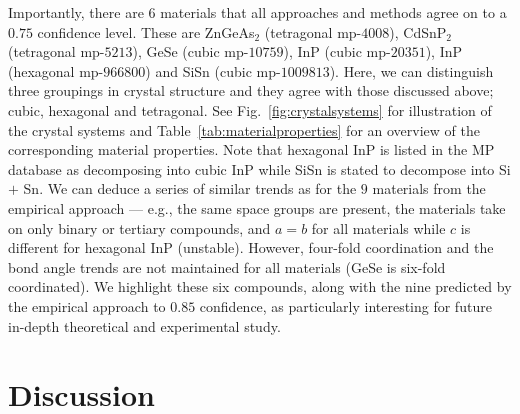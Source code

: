 \documentclass[superscriptaddress,unsortedaddress,
 amsmath,amssymb,
 aps,
]{revtex4-2}
\begin{document}
Importantly, there are $6$ materials that all approaches and methods agree on to a $0.75$ confidence level. These are ZnGeAs$_2$ (tetragonal mp-$4008$), CdSnP$_2$ (tetragonal mp-$5213$), GeSe (cubic mp-$10759$), InP (cubic mp-$20351$), InP (hexagonal mp-$966800$) and SiSn (cubic mp-$1009813$). Here, we can distinguish three groupings in crystal structure and they agree with those discussed above; cubic, hexagonal and tetragonal. See Fig.~\ref{fig:crystalsystems} for illustration of the crystal systems and Table~\ref{tab:materialproperties} for an overview of the corresponding material properties.     
Note that hexagonal InP is listed in the MP database as decomposing into cubic InP while SiSn is stated to decompose into Si $+$ Sn. 
We can deduce a series of similar trends as for the $9$ materials from the empirical approach --- e.g., the same space groups are present, the materials take on only binary or tertiary compounds, and $a=b$ for all materials while $c$ is different for hexagonal InP (unstable). However, four-fold coordination and the bond angle trends are not maintained for all materials (GeSe is six-fold coordinated). 
We highlight these six compounds, along with the nine predicted by the empirical approach to $0.85$ confidence, as particularly interesting for future in-depth theoretical and experimental study. 

\section*{Discussion}
\end{document}
